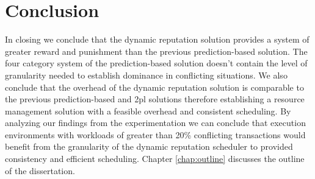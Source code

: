 \section{Conclusion}
\label{sec:conclusion}


In closing we conclude that the dynamic reputation solution provides a system of greater reward and punishment than the previous prediction-based solution. The four category system of the prediction-based solution doesn't contain the level of granularity needed to establish dominance in conflicting situations. We also conclude that the overhead of the dynamic reputation solution is comparable to the previous prediction-based and \gls{2pl} solutions therefore establishing a resource management solution with a feasible overhead and consistent scheduling. By analyzing our findings from the experimentation we can conclude that execution environments with workloads of greater than 20\% conflicting transactions would benefit from the granularity of the dynamic reputation scheduler to provided consistency and efficient scheduling. Chapter \ref{chap:outline} discusses the outline of the dissertation.